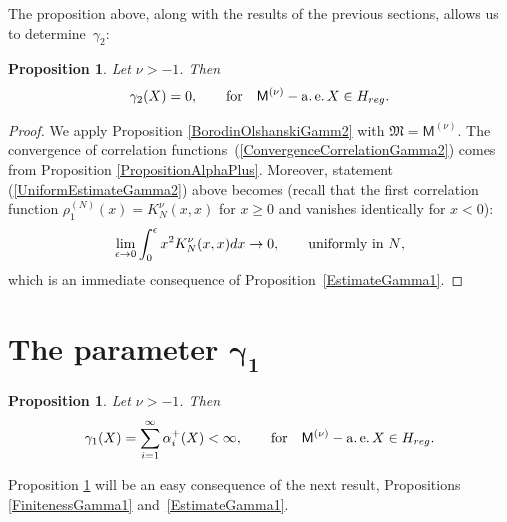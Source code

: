 \documentclass[11pt]{article}
\numberwithin{equation}{section}
\newtheorem{Proposition}[Theorem]{Proposition}
{ \theoremstyle{definition}
\newtheorem{Definition}[Theorem]{Definition}
\newtheorem{Remark}[Theorem]{Remark} }
\begin{document}
The proposition above, along with the results of the previous sections, allows us to determine~$\gamma_2$:

\begin{Proposition}\label{PropositionGamma2}
Let $\nu>-1$. Then
\begin{gather*}
\gamma_2(X)=0, \qquad \text{for} \quad \mathsf{M}^{(\nu)}-\operatorname{a.e.} X \in H_{{\rm reg}}.
\end{gather*}
\end{Proposition}

\begin{proof} We apply Proposition \ref{BorodinOlshanskiGamm2} with $\mathfrak{M}=\mathsf{M}^{(\nu)}$. The convergence of correlation functions~(\ref{ConvergenceCorrelationGamma2}) comes from Proposition \ref{PropositionAlphaPlus}. Moreover,
statement (\ref{UniformEstimateGamma2}) above becomes (recall that the first correlation function $\rho_1^{(N)}(x)=K_N^{\nu}(x,x)$ for $x\ge 0$ and vanishes identically for $x<0$):
\begin{gather*}
\lim_{\epsilon \to 0} \int_{0}^{\epsilon}x^2 K_N^{\nu}(x,x){\rm d}x \to 0, \qquad \text{uniformly in $N$},
\end{gather*}
which is an immediate consequence of Proposition~\ref{EstimateGamma1}.
\end{proof}

\section[The parameter $\gamma_1$]{The parameter $\boldsymbol{\gamma_1}$}\label{section7}

\begin{Proposition}\label{PropositionGamma1}
Let $\nu>-1$. Then
\begin{gather*}
\gamma_1(X)=\sum_{i=1}^{\infty}\alpha_i^+(X)<\infty, \qquad \text{for} \quad \mathsf{M}^{(\nu)}-\operatorname{a.e.} X \in H_{{\rm reg}}.
\end{gather*}
\end{Proposition}

Proposition \ref{PropositionGamma1} will be an easy consequence of the next result, Propositions \ref{FinitenessGamma1} and~\ref{EstimateGamma1}.
\end{document}
